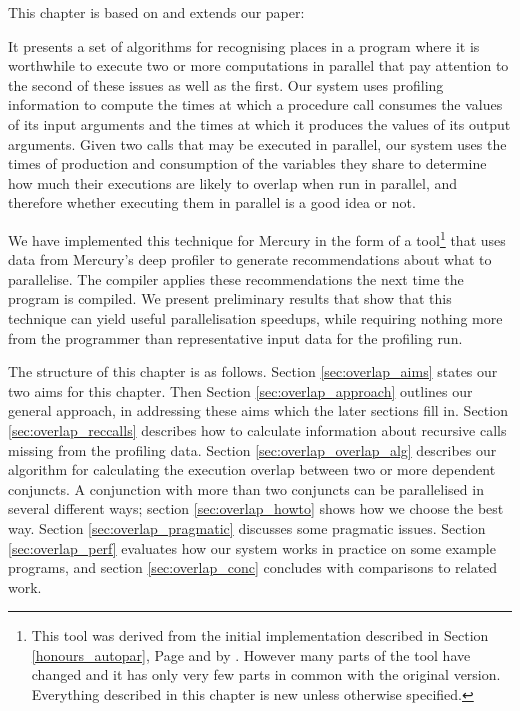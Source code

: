 This chapter is based on and extends our paper:

\begin{quote}
\end{quote}

\noindent
It presents a set of algorithms for recognising places in a program
where it is worthwhile to execute two or more computations in parallel
that pay attention to the second of these issues as well as the first.
Our system uses profiling information to compute
the times at which a procedure call consumes the values of its input arguments
and the times at which it produces the values of its output arguments.
Given two calls that may be executed in parallel,
our system uses the times of production and consumption
of the variables they share
to determine how much their executions are likely to overlap
when run in parallel,
and therefore whether executing them in parallel is a good idea or not.

We have implemented this technique for Mercury
in the form of a tool\footnote{
    This tool was derived from the initial implementation described in
    Section \ref{honours_autopar}, Page \pageref{honours_autopar} and by
    \citet{bone:2008:hons}.
    However many parts of the tool have changed and it has only very few
    parts in common with the original version.
    Everything described in this chapter is new unless otherwise specified.}
that uses data from Mercury's deep profiler
to generate recommendations about what to parallelise.
The compiler applies these recommendations the next time the program is
compiled.
We present preliminary results that show that
this technique can yield useful parallelisation speedups,
while requiring nothing more from the programmer
than representative input data for the profiling run.

The structure of this chapter is as follows.
Section \ref{sec:overlap_aims} states our two aims for this chapter.
Then Section \ref{sec:overlap_approach} outlines our general approach,
in addressing these aims
which the later sections fill in.
Section \ref{sec:overlap_reccalls}
describes how to calculate information about recursive calls missing from
the profiling data.
Section \ref{sec:overlap_overlap_alg} describes our algorithm for
calculating the execution overlap between two or more dependent conjuncts.
A conjunction with more than two conjuncts can be parallelised
in several different ways;
section \ref{sec:overlap_howto} shows how we choose the best way.
Section \ref{sec:overlap_pragmatic} discusses some pragmatic issues.
Section \ref{sec:overlap_perf} evaluates
how our system works in practice on some example programs, and
section \ref{sec:overlap_conc} concludes
with comparisons to related work.

